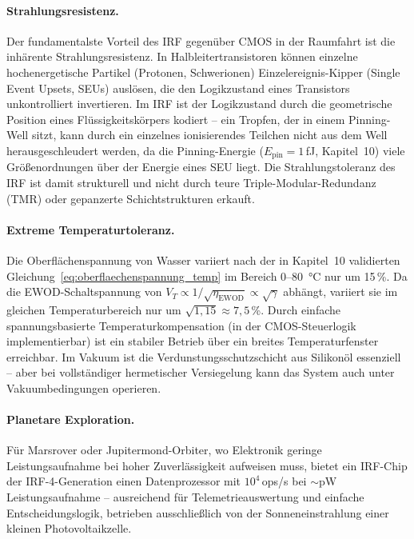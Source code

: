 ﻿\documentclass[a4paper,12pt]{scrreprt}
\theoremstyle{definition}
\begin{document}
\paragraph{Strahlungsresistenz.}
Der fundamentalste Vorteil des IRF gegenüber CMOS in der Raumfahrt ist die
inhärente Strahlungsresistenz. In Halbleitertransistoren können einzelne
hochenergetische Partikel (Protonen, Schwerionen) Einzelereignis-Kipper
(Single Event Upsets, SEUs) auslösen, die den Logikzustand eines Transistors
unkontrolliert invertieren. Im IRF ist der Logikzustand durch die geometrische
Position eines Flüssigkeitskörpers kodiert -- ein Tropfen, der in einem
Pinning-Well sitzt, kann durch ein einzelnes ionisierendes Teilchen nicht
aus dem Well herausgeschleudert werden, da die Pinning-Energie
($E_\text{pin} = 1$\,fJ, Kapitel~10) viele Größenordnungen über der
Energie eines SEU liegt. Die Strahlungstoleranz des IRF ist damit strukturell
und nicht durch teure Triple-Modular-Redundanz (TMR) oder gepanzerte
Schichtstrukturen erkauft.

\paragraph{Extreme Temperaturtoleranz.}
Die Oberflächenspannung von Wasser variiert nach der in Kapitel~10 validierten
Gleichung~\eqref{eq:oberflaechenspannung_temp} im Bereich 0--80\, °C nur um
15\,\%. Da die EWOD-Schaltspannung von $V_T \propto 1/\sqrt{\eta_\text{EWOD}}
\propto \sqrt{\gamma}$ abhängt, variiert sie im gleichen Temperaturbereich
nur um $\sqrt{1{,}15} \approx 7{,}5$\,\%. Durch einfache spannungsbasierte
Temperaturkompensation (in der CMOS-Steuerlogik implementierbar) ist ein
stabiler Betrieb über ein breites Temperaturfenster erreichbar. Im Vakuum
ist die Verdunstungsschutzschicht aus Silikonöl essenziell -- aber bei
vollständiger hermetischer Versiegelung kann das System auch unter Vakuumbedingungen
operieren.

\paragraph{Planetare Exploration.}
Für Marsrover oder Jupitermond-Orbiter, wo Elektronik geringe Leistungsaufnahme
bei hoher Zuverlässigkeit aufweisen muss, bietet ein IRF-Chip der IRF-4-Generation
einen Datenprozessor mit $10^4$\,ops/s bei $\sim$pW Leistungsaufnahme --
ausreichend für Telemetrieauswertung und einfache Entscheidungslogik,
betrieben ausschließlich von der Sonneneinstrahlung einer kleinen
Photovoltaikzelle.
\end{document}
